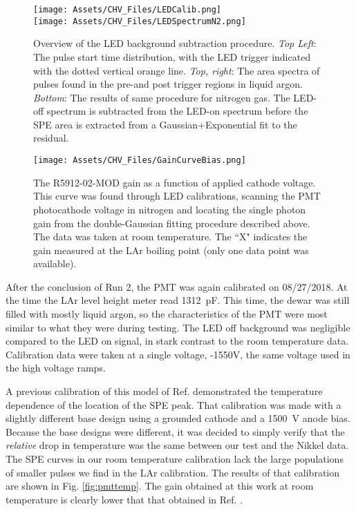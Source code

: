\begin{figure}
\centering
\texttt{[image: Assets/CHV\_Files/LEDCalib.png]}\\
\texttt{[image: Assets/CHV\_Files/LEDSpectrumN2.png]}
\label{fig:led_calib}
\caption [ Overview of the LED background subtraction procedure.]%
{ Overview of the LED background subtraction procedure.
\textit{Top Left}: The pulse start time distribution, with the LED trigger indicated with the dotted vertical orange line.
\textit{Top, right}: The area spectra of pulses found in the pre-and post trigger regions in liquid argon.
\textit{Bottom}: The results of same procedure for nitrogen gas. 
The LED-off spectrum is subtracted from the LED-on spectrum before the SPE area is extracted from a Gaussian+Exponential fit to the residual.
}
\end{figure}

\begin{figure}
\texttt{[image: Assets/CHV\_Files/GainCurveBias.png]}
\label{fig:pmtgain}
\caption[The R5912-02-MOD gain as a function of applied cathode voltage.]%
{The R5912-02-MOD gain as a function of applied cathode voltage.
This curve was found through LED calibrations, scanning the PMT photocathode voltage in nitrogen and locating the single photon gain from the double-Gaussian fitting procedure described above.
The data was taken at room temperature.
The ``X" indicates the gain measured at the LAr boiling point (only one data point was available).}
\end{figure}

After the conclusion of Run 2, the PMT was again calibrated on 08/27/2018.
At the time the LAr level height meter read 1312~pF.
This time, the dewar was still filled with mostly liquid argon, so the characteristics of the PMT were most similar to what they were during testing.
The LED off background was negligible compared to the LED on signal, in stark contrast to the room temperature data. 
Calibration data were taken at a single voltage, -1550V, the same voltage used in the high voltage ramps.

A previous calibration of this model of Ref. \cite{nikkel_demonstration_2007} demonstrated the temperature dependence of the location of the SPE peak.
That calibration was made with a slightly different base design using a grounded cathode and a 1500~V anode bias.
Because the base designs were different, it was decided to simply verify that the \textit{relative} drop in temperature was the same between our test and the Nikkel data.
The SPE curves in our room temperature calibration lack the large populations of smaller pulses we find in the LAr calibration.
The results of that calibration are shown in Fig. \ref{fig:pmttemp}.
The gain obtained at this work at room temperature is clearly lower that that obtained in Ref. \cite{nikkel_demonstration_2007}.


